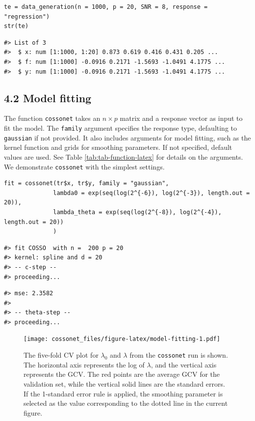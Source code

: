 \begin{verbatim}
te = data_generation(n = 1000, p = 20, SNR = 8, response = "regression")
str(te)
\end{verbatim}

\begin{verbatim}
#> List of 3
#>  $ x: num [1:1000, 1:20] 0.873 0.619 0.416 0.431 0.205 ...
#>  $ f: num [1:1000] -0.0916 0.2171 -1.5693 -1.0491 4.1775 ...
#>  $ y: num [1:1000] -0.0916 0.2171 -1.5693 -1.0491 4.1775 ...
\end{verbatim}

\hypertarget{ssec4_2}{%
\subsection{4.2 Model fitting}\label{ssec4_2}}

The function \texttt{cossonet} takes an \(n \times p\) matrix and a response vector as input to fit the model. The \texttt{family} argument specifies the response type, defaulting to \texttt{gaussian} if not provided. It also includes arguments for model fitting, such as the kernel function and grids for smoothing parameters. If not specified, default values are used. See Table \ref{tab:tab-function-latex} for details on the arguments. We demonstrate \texttt{cossonet} with the simplest settings.

\begin{verbatim}
fit = cossonet(tr$x, tr$y, family = "gaussian", 
              lambda0 = exp(seq(log(2^{-6}), log(2^{-3}), length.out = 20)),
              lambda_theta = exp(seq(log(2^{-8}), log(2^{-4}), length.out = 20))
              )
\end{verbatim}

\begin{verbatim}
#> fit COSSO  with n =  200 p = 20 
#> kernel: spline and d = 20 
#> -- c-step -- 
#> proceeding...
\end{verbatim}

\begin{verbatim}
#> mse: 2.3582 
#> 
#> -- theta-step -- 
#> proceeding...
\end{verbatim}

\begin{figure}
\centering
\texttt{[image: cossonet\_files/figure-latex/model-fitting-1.pdf]}
\caption{\label{fig:model-fitting}The five-fold CV plot for \(\lambda_0\) and \(\lambda\) from the \texttt{cossonet} run is shown. The horizontal axis represents the log of \(\lambda\), and the vertical axis represents the GCV. The red points are the average GCV for the validation set, while the vertical solid lines are the standard errors. If the 1-standard error rule is applied, the smoothing parameter is selected as the value corresponding to the dotted line in the current figure.}
\end{figure}


